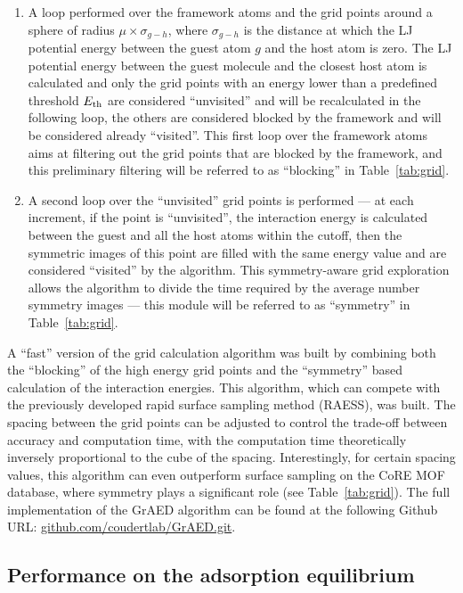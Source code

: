 \documentclass[main]{subfiles}
\begin{document}
\begin{enumerate}
  \item A loop performed over the framework atoms and the grid points around a sphere of radius $\mu\times\sigma_{g-h}$, where $\sigma_{g-h}$ is the distance at which the LJ potential energy between the guest atom $g$ and the host atom is zero. The LJ potential energy between the guest molecule and the closest host atom is calculated and only the grid points with an energy lower than a predefined threshold $E_{\text{th}}$ are considered ``unvisited'' and will be recalculated in the following loop, the others are considered blocked by the framework and will be considered already ``visited''. This first loop over the framework atoms aims at filtering out the grid points that are blocked by the framework, and this preliminary filtering will be referred to as ``blocking'' in Table~\ref{tab:grid}.
  \item A second loop over the ``unvisited'' grid points is performed --- at each increment, if the point is ``unvisited'', the interaction energy is calculated between the guest and all the host atoms within the cutoff, then the symmetric images of this point are filled with the same energy value and are considered ``visited'' by the algorithm. This symmetry-aware grid exploration allows the algorithm to divide the time required by the average number symmetry images --- this module will be referred to as ``symmetry'' in Table~\ref{tab:grid}.
\end{enumerate}

A ``fast'' version of the grid calculation algorithm was built by combining both the ``blocking'' of the high energy grid points and the ``symmetry'' based calculation of the interaction energies. This algorithm, which can compete with the previously developed rapid surface sampling method (RAESS), was built. The spacing between the grid points can be adjusted to control the trade-off between accuracy and computation time, with the computation time theoretically inversely proportional to the cube of the spacing. Interestingly, for certain spacing values, this algorithm can even outperform surface sampling on the CoRE MOF database, where symmetry plays a significant role (see Table~\ref{tab:grid}). The full implementation of the GrAED algorithm can be found at the following Github URL: \url{github.com/coudertlab/GrAED.git}.

\subsection{Performance on the adsorption equilibrium}
\end{document}
